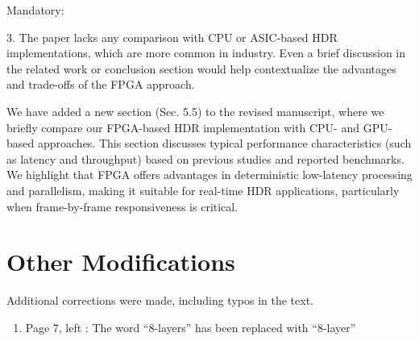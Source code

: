 \documentclass[a4j]{jsarticle}
\begin{document}
\vspace{0.3cm}
\begin{screen}
Mandatory:

3. The paper lacks any comparison with CPU or ASIC-based HDR implementations, which are more common in industry. Even a brief discussion in the related work or conclusion section would help contextualize the advantages and trade-offs of the FPGA approach.
\end{screen}
We have added a new section (Sec. 5.5) to the revised manuscript, 
where we briefly compare our FPGA-based HDR implementation 
with CPU- and GPU-based approaches.
This section discusses typical performance characteristics (such as latency and 
throughput) based on previous studies and reported benchmarks. 
We highlight that FPGA offers advantages in deterministic low-latency processing 
and parallelism, making it suitable for real-time HDR applications, 
particularly when frame-by-frame responsiveness is critical.


\section*{Other Modifications}
Additional corrections were made, including typos in the text.

\begin{enumerate}
  \item Page 7, left : The word ``8-layers'' has been replaced with ``8-layer''
\end{enumerate}
\end{document}
